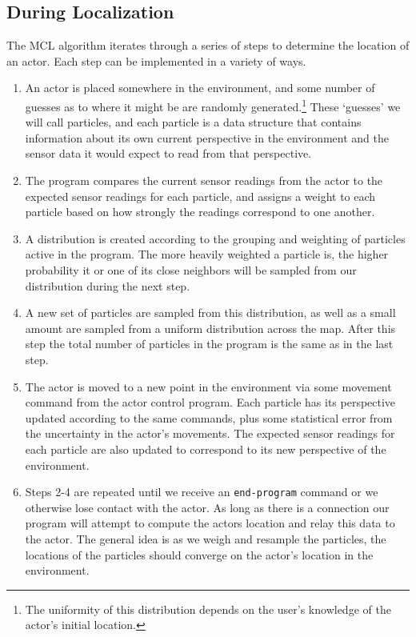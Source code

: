 \documentclass[a4paper,11pt]{article}
\begin{document}
\subsection{During Localization}
  The MCL algorithm iterates through a series of steps to determine the location of an actor. Each step can be implemented in a variety of ways.
  \begin{enumerate}
  \item An actor is placed somewhere in the environment, and some number of guesses as to where it might be are randomly generated.\footnote{The uniformity of this distribution depends on the user's knowledge of the actor's initial location.} These `guesses' we will call particles, and each particle is a data structure that contains information about its own current perspective in the environment and the sensor data it would expect to read from that perspective.
  \item The program compares the current sensor readings from the actor to the expected sensor readings for each particle, and assigns a weight to each particle based on how strongly the readings correspond to one another.
  \item A distribution is created according to the grouping and weighting of particles active in the program. The more heavily weighted a particle is, the higher probability it or one of its close neighbors will be sampled from our distribution during the next step.
  \item A new set of particles are sampled from this distribution, as well as a small amount are sampled from a uniform distribution across the map. After this step the total number of particles in the program is the same as in the last step.
  \item The actor is moved to a new point in the environment via some movement command from the actor control program. Each particle has its perspective updated according to the same commands, plus some statistical error from the uncertainty in the actor's movements. The expected sensor readings for each particle are also updated to correspond to its new perspective of the environment.
  \item Steps 2-4 are repeated until we receive an \texttt{end-program} command or we otherwise lose contact with the actor. As long as there is a connection our program will attempt to compute the actors location and relay this data to the actor. The general idea is as we weigh and resample the particles, the locations of the particles should converge on the actor's location in the environment.
  \end{enumerate} 
\end{document}
